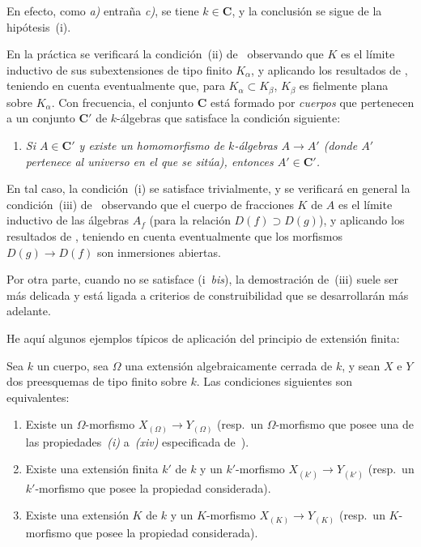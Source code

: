 En efecto, como \emph{a)} entraña \emph{c)}, se tiene $k\in\boldsymbol{C}$, y la conclusión se sigue de la hipótesis~(i).

\begin{remark}[9.1.3]
\label{IV.9.1.3}
En la práctica se verificará la condición~(ii) de~ observando que $K$ es el límite inductivo de sus subextensiones de tipo finito $K_\alpha$, y aplicando los resultados de , teniendo en cuenta eventualmente que, para $K_\alpha\subset K_\beta$, $K_\beta$ es fielmente plana sobre $K_\alpha$.
Con frecuencia, el conjunto $\boldsymbol{C}$ está formado por \emph{cuerpos} que pertenecen a un conjunto $\boldsymbol{C}'$ de $k$-álgebras que satisface la condición siguiente:
\begin{enumerate}[label=(\roman*~\emph{bis})]
  \item \itshape Si $A\in\boldsymbol{C}'$ y existe un homomorfismo de $k$-álgebras $A\to A'$ (donde $A'$ pertenece al universo en el que se sitúa), entonces $A'\in\boldsymbol{C}'$.
\end{enumerate}
\end{remark}

En tal caso, la condición~(i) se satisface trivialmente, y se verificará en general la condición~(iii) de~ observando que el cuerpo de fracciones $K$ de $A$ es el límite inductivo de las álgebras $A_f$ (para la relación $D(f)\supset D(g)$), y aplicando los resultados de , teniendo en cuenta eventualmente que los morfismos $D(g)\to D(f)$ son inmersiones abiertas.

Por otra parte, cuando no se satisface (i~\emph{bis}), la demostración de~(iii) suele ser más delicada y está ligada a criterios de construibilidad que se desarrollarán más adelante.

He aquí algunos ejemplos típicos de aplicación del principio de extensión finita:

\begin{proposition}[9.1.4]
\label{IV.9.1.4}
Sea $k$ un cuerpo, sea $\Omega$ una extensión algebraicamente cerrada de $k$, y sean $X$ e $Y$ dos preesquemas de tipo finito sobre $k$.
Las condiciones siguientes son equivalentes:
\begin{enumerate}[label=\emph{\alph*)}]
  \item Existe un $\Omega$-morfismo $X_{(\Omega)}\to Y_{(\Omega)}$ \textnormal{(}\textup{resp.}\ un $\Omega$-morfismo que posee una de las propiedades~\emph{(i)} a~\emph{(xiv)} especificada de~\textnormal{)}.
  \item Existe una extensión finita $k'$ de $k$ y un $k'$-morfismo $X_{(k')}\to Y_{(k')}$ \textnormal{(}\textup{resp.}\ un $k'$-morfismo que posee la propiedad considerada\textnormal{)}.
  \item Existe una extensión $K$ de $k$ y un $K$-morfismo $X_{(K)}\to Y_{(K)}$ \textnormal{(}\textup{resp.}\ un $K$-morfismo que posee la propiedad considerada\textnormal{)}.
\end{enumerate}
\end{proposition}

